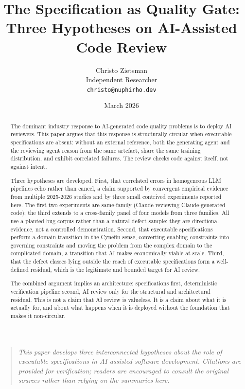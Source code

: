 \documentclass{article}
\title{The Specification as Quality Gate:\\Three Hypotheses on AI-Assisted Code Review}
\author{
  Christo Zietsman \\
  Independent Researcher \\
  \texttt{christo@nuphirho.dev}
}
\date{March 2026}
\begin{document}
\maketitle

\begin{quote}
\itshape
This paper develops three interconnected hypotheses about the role of
executable specifications in AI-assisted software development. Citations
are provided for verification; readers are encouraged to consult the
original sources rather than relying on the summaries here.
\end{quote}

\begin{abstract}
The dominant industry response to AI-generated code quality problems is
to deploy AI reviewers. This paper argues that this response is
structurally circular when executable specifications are absent: without
an external reference, both the generating agent and the reviewing agent
reason from the same artefact, share the same training distribution, and
exhibit correlated failures. The review checks code against itself, not
against intent.

Three hypotheses are developed. First, that correlated errors in
homogeneous LLM pipelines echo rather than cancel, a claim supported by
convergent empirical evidence from multiple 2025-2026 studies and by three
small contrived experiments reported here. The first two experiments are
same-family (Claude reviewing Claude-generated code); the third extends to
a cross-family panel of four models from three families. All use a planted
bug corpus rather than a natural defect sample; they are directional
evidence, not a controlled demonstration.
Second, that executable specifications perform a domain transition in the
Cynefin sense, converting enabling constraints into governing constraints
and moving the problem from the complex domain to the complicated domain,
a transition that AI makes economically viable at scale. Third, that
the defect classes lying outside the reach of executable specifications
form a well-defined residual, which is the legitimate and bounded target
for AI review.

The combined argument implies an architecture: specifications first,
deterministic verification pipeline second, AI review only for the
structural and architectural residual. This is not a claim that AI review
is valueless. It is a claim about what it is actually for, and about what
happens when it is deployed without the foundation that makes it
non-circular.

\end{abstract}
\end{document}
